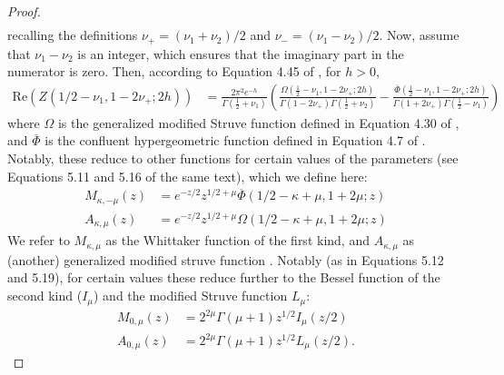 \documentclass[11pt]{article}
\begin{document}
\begin{proof}
\begin{align*}
\end{align*}recalling the definitions $\nu_+ = (\nu_1 + \nu_2)/2$ and $\nu_- = (\nu_1 - \nu_2)/2$. Now, assume that $\nu_1 - \nu_2$ is an integer, which ensures that the imaginary part in the numerator is zero.
Then, according to Equation 4.45 of \cite{babister_transcendental_1967}, for $h > 0$, \begin{align*}
\textrm{Re}(Z(1/2 - \nu_{1},1 -2\nu_+;2h))%
&= \frac{2\pi^2e^{-h}}{\Gamma(\frac12 + \nu_{1})}\left(\frac{\Omega(\frac12 - \nu_{1},1 - 2\nu_+;2h)}{\Gamma(1 -2\nu_+)\Gamma(\frac12 + \nu_{2})} - \frac{\overline{\Phi}(\frac12 - \nu_{1},1 - 2\nu_{+};2h)}{\Gamma(1 + 2\nu_+)\Gamma(\frac12 - \nu_{1})}\right)
\end{align*}where $\Omega$ is the generalized modified Struve function defined in Equation 4.30 of \cite{babister_transcendental_1967}, and $\overline{\Phi}$ is the confluent hypergeometric function defined in Equation 4.7 of \cite{babister_transcendental_1967}. Notably, these reduce to other functions for certain values of the parameters (see Equations 5.11 and 5.16 of the same text), which we define here: \begin{align*}
M_{\kappa,- \mu}(z) &=  e^{-z/2}z^{1/2 +\mu}\overline{\Phi}(1/2- \kappa + \mu, 1 + 2\mu; z)\\
A_{\kappa, \mu}(z) &= e^{-z/2}z^{1/2 + \mu}\Omega(1/2- \kappa + \mu, 1 + 2\mu; z)
\end{align*}We refer to $M_{\kappa, \mu}$ as the Whittaker function of the first kind, and $A_{\kappa, \mu}$ as (another) generalized modified struve function \citep{babister_transcendental_1967}. Notably (as in Equations 5.12 and 5.19), for certain values these reduce further to the Bessel function of the second kind ($I_\mu$) and the modified Struve function $L_\mu$:\begin{align*}
M_{0,\mu}(z) &= 2^{2\mu}\Gamma(\mu + 1)z^{1/2}I_\mu(z/2)\\
A_{0,\mu}(z) &= 2^{2\mu}\Gamma(\mu + 1)z^{1/2}L_\mu(z/2).
\end{align*}


\end{proof}
\end{document}
